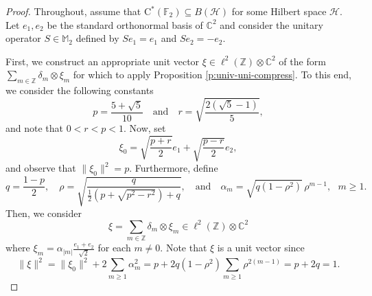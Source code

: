 \documentclass[10pt]{amsart}
\newcommand{\bC}{{\mathbb{C}}}
\newcommand{\bF}{{\mathbb{F}}}
\newcommand{\bM}{{\mathbb{M}}}
\newcommand{\bZ}{{\mathbb{Z}}}
\renewcommand{\H}{{\mathcal{H}}}
\newcommand{\rC}{\mathrm{C}}
\begin{document}
\begin{proof}
    Throughout, assume that $\rC^*(\bF_2)\subseteq B(\H)$ for some Hilbert space $\H$. Let $e_1, e_2$ be the standard orthonormal basis of $\bC^2$ and consider the unitary operator $S\in \bM_2$ defined by $Se_1=e_1$ and $Se_2=-e_2$.
    
    First, we construct an appropriate unit vector $\xi\in\ell^2(\bZ)\otimes\bC^2$ of the form $\sum_{m\in\bZ} \delta_m\otimes\xi_m$ for which to apply Proposition \ref{p:univ-uni-compress}. To this end, we consider the following constants
    \[
        p=\frac{5+\sqrt5}{10} \quad \text{and} \quad r=\sqrt{\frac{2(\sqrt5-1)}{5}},
    \]
    and note that $0<r<p<1$. Now, set
    \[
        \xi_0 = \sqrt{\frac{p+r}{2}}e_1 + \sqrt{\frac{p-r}{2}}e_2,
    \]
    and observe that $\|\xi_0\|^2 = p$. Furthermore, define
    \[
        q=\frac{1-p}{2}, \quad \rho=\sqrt{\frac{q}{\frac{1}{2}(p+\sqrt{p^2-r^2})+q}}, \quad \text{and} \quad \alpha_m = \sqrt{q(1-\rho^2)}\,\rho^{m-1}, \ \ \ m\geq 1.
    \]
    Then, we consider
    \[
        \xi=\sum_{m\in\bZ}\delta_m\otimes \xi_m\in \ell^2(\bZ)\otimes\bC^2
    \]
    where $\xi_m = \alpha_{|m|}\frac{e_1+e_2}{\sqrt2}$ for each $m\neq 0$. Note that $\xi$ is a unit vector since
    \[
        \|\xi\|^2 = \|\xi_0\|^2 +2\sum_{m\geq1}\alpha_m^2 = p + 2q(1-\rho^2)\sum_{m\geq1}\rho^{2(m-1)} = p+2q = 1.
    \]


\end{proof}
\end{document}
